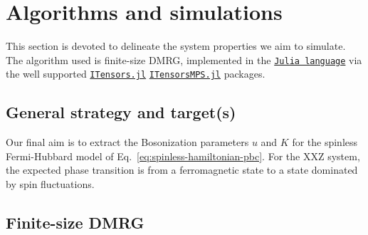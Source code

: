 \clearpage
\section{Algorithms and simulations}

This section is devoted to delineate the system properties we aim to simulate. The algorithm used is finite-size DMRG, implemented in the \href{https://docs.julialang.org/en/}{\texttt{Julia language}} via the well supported \href{https://itensor.github.io/ITensors.jl/stable/index.html}{\texttt{ITensors.jl}} \href{https://itensor.github.io/ITensorMPS.jl/stable/}{\texttt{ITensorsMPS.jl}} packages.

\subsection{General strategy and target(s)}

Our final aim is to extract the Bosonization parameters $u$ and $K$ for the spinless Fermi-Hubbard model of Eq.~\eqref{eq:spinless-hamiltonian-pbc}. For the $\mathrm{XXZ}$ system, the expected phase transition is from a ferromagnetic state to a state dominated by spin fluctuations. \todo

\subsection{Finite-size DMRG}

\todo